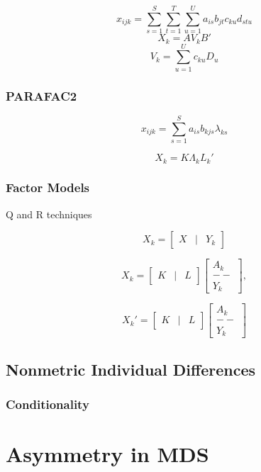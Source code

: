 \documentclass[
  12pt,
  letterpaper,
  DIV=11,
  numbers=noendperiod]{scrreprt}
\theoremstyle{remark}
\begin{document}
\[
x_{ijk}=\sum_{s=1}^S\sum_{t=1}^T\sum_{u=1}^Ua_{is}b_{jt}c_{ku}d_{stu}
\] \[
X_k=AV_kB'
\] \[
V_k=\sum_{u=1}^Uc_{ku}D_u
\]

\subsection{PARAFAC2}\label{inddifparafac2}

\[
x_{ijk}=\sum_{s=1}^Sa_{is}b_{kjs}\lambda_{ks}
\]

\[X_k=K\Lambda_k^{\ }L_k'\]

\subsection{Factor Models}\label{inddiffa}

Q and R techniques

\[X_k=\begin{bmatrix}X&\mid&Y_k\end{bmatrix}\]

\[X_k=\begin{bmatrix}K&\mid&L\end{bmatrix}\begin{bmatrix}A_k\\--\\Y_k\end{bmatrix},\]

\[X_k'=\begin{bmatrix}K&\mid&L\end{bmatrix}\begin{bmatrix}A_k\\--\\Y_k\end{bmatrix}\]

\section{Nonmetric Individual
Differences}\label{nonmetric-individual-differences}

\subsection{Conditionality}\label{conditionality}


\chapter{Asymmetry in MDS}\label{asymmds}
\end{document}
